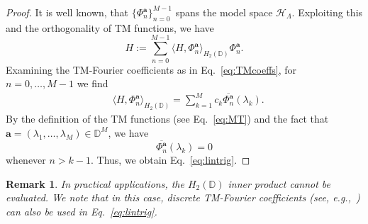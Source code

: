 \documentclass{arxiv}
\newtheorem{remarks}{Remark}[section]
\begin{document}
\begin{proof}
  It is well known, that ${\{ \Phi_n^{\boldsymbol{a}} \}}_{n=0}^{M-1}$ spans the model space $\mathcal{H}_{\Lambda}$. Exploiting this and the orthogonality of TM functions, we have
    \begin{equation*}
        H := \sum_{n=0}^{M-1} \langle H, \Phi_n^{\boldsymbol{a}} \rangle_{H_2(\mathbb{D})} \Phi_n^{\boldsymbol{a}}.
    \end{equation*}
    Examining the TM-Fourier coefficients as in Eq.~\eqref{eq:TMcoeffs}, for $n=0,\ldots,M-1$ we find
    \begin{equation*}
        \begin{split}
            & \langle H, \Phi_n^{\boldsymbol{a}} \rangle_{H_2(\mathbb{D})} = 
            \sum_{k=1}^M c_k \overline{\Phi_n^{\boldsymbol{a}}}(\lambda_k).
        \end{split}
    \end{equation*}
    By the definition of the TM functions (see Eq.~\eqref{eq:MT}) and the fact that $\boldsymbol{a} = (\lambda_1, \ldots, \lambda_M) \in \mathbb{D}^M$, we have
    $$
        \overline{\Phi_n^{\boldsymbol{a}}}(\lambda_k) = 0
    $$
    whenever $n > k-1$. Thus, we obtain Eq.~\eqref{eq:lintrig}.
    
\end{proof}

\begin{remarks}
    In practical applications, the $H_2(\mathbb{D})$ inner product cannot be evaluated. We note that in this case, discrete TM-Fourier coefficients (see, e.g.,~\cite[Sect.~4]{siamdozsa}) can also be used in Eq.~\eqref{eq:lintrig}.
\end{remarks}
\end{document}
